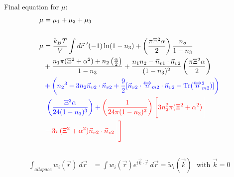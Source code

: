 \documentclass[double,12pt]{revtex4-2}
\begin{document}
Final equation for $\mu$:  
\begin{align}
   \mu &= \mu_1 + \mu_2 + \mu_3  \\ \nonumber \\
%
   \mu &=\frac{k_BT}{V}\int d\vec r~' (-1)\ln(1-n_3)+\left(
        \frac{\pi\Xi^2\alpha}{2}\right)\frac{n_o}
        {1-n_3} \\
    &+ \frac{n_1\pi(\Xi^2 + \alpha^2)
       +n_2\left(\frac{\alpha}{2}\right)}{1-n_3} + \frac{n_1n_2-\vec n_{v1}
         \cdot \vec n_{v2}}{(1-n_3)^2}
          \left(\frac{\pi\Xi^2\alpha}{2}\right) \\
   &\color{blue}+\left({n_2}^3-3n_2
   \vec{n}_{v2}\cdot\vec{n}_{v2} 
    +\frac{9}{2}[\vec{n}_{v2}\cdot{\overleftrightarrow{n}_{m2}}\cdot{
    \vec{n}_{v2}}-\operatorname{Tr}({\overleftrightarrow{n}^3_{m2}})]
    \right) \\
    &\color{blue}~\left(\frac{\Xi^2\alpha}{24(1-n_3)^3}
    \right) + \color{red}\left(\frac{1}{24\pi(1-n_3)^2}\right)\Bigg[
    \color{white}\color{black}
    \color{red}3n_2^2\pi(\Xi^2 + \alpha^2) \color{white}\Bigg] \\
    &\color{red}- 3\pi(\Xi^2 + \alpha^2)\vec n_{v2} \cdot \vec n_{v2}
    \color{white}\Bigg[\color{black}\color{red}\Bigg]
\end{align}

\[\]
\[\]
\[\]
\[\]
\[\]
\[\]


\begin{align}
   \int_{all space} w_i(\vec r) ~d\vec r &= \int w_i(\vec r)e^{i\vec k \cdot 
   \vec r}~d\vec r 
    = \widetilde{w}_i(\vec k) \mbox{~~with $\vec k = 0$}
\end{align}
\end{document}
